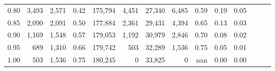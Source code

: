 \begin{tabular}{rrrrrrrrrrrrrr}
0.80 &   3,493 &  2,571 &  0.42 &  175,794 &    4,451 &  27,340 &   6,485 &  0.59 &  0.19 &      0.05 \\
0.85 &   2,090 &  2,091 &  0.50 &  177,884 &    2,361 &  29,431 &   4,394 &  0.65 &  0.13 &      0.03 \\
0.90 &   1,169 &  1,548 &  0.57 &  179,053 &    1,192 &  30,979 &   2,846 &  0.70 &  0.08 &      0.02 \\
0.95 &     689 &  1,310 &  0.66 &  179,742 &      503 &  32,289 &   1,536 &  0.75 &  0.05 &      0.01 \\
1.00 &     503 &  1,536 &  0.75 &  180,245 &        0 &  33,825 &       0 &   nan &  0.00 &      0.00 \\
\bottomrule
\end{tabular}
